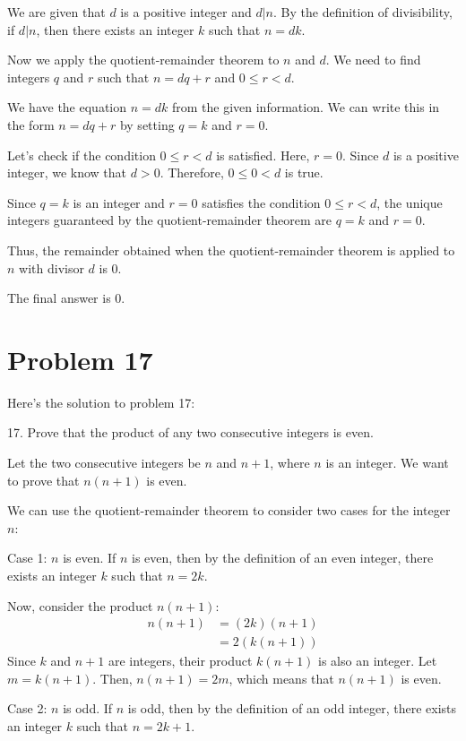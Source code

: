 \documentclass{article}
\begin{document}
We are given that $d$ is a positive integer and $d|n$.
By the definition of divisibility, if $d|n$, then there exists an integer $k$ such that $n = dk$.

Now we apply the quotient-remainder theorem to $n$ and $d$. We need to find integers $q$ and $r$ such that $n = dq + r$ and $0 \le r < d$.

We have the equation $n = dk$ from the given information.
We can write this in the form $n = dq + r$ by setting $q = k$ and $r = 0$.

Let's check if the condition $0 \le r < d$ is satisfied.
Here, $r = 0$.
Since $d$ is a positive integer, we know that $d > 0$.
Therefore, $0 \le 0 < d$ is true.

Since $q=k$ is an integer and $r=0$ satisfies the condition $0 \le r < d$, the unique integers guaranteed by the quotient-remainder theorem are $q=k$ and $r=0$.

Thus, the remainder obtained when the quotient-remainder theorem is applied to $n$ with divisor $d$ is 0.

The final answer is $\boxed{0}$.

\newpage

\section*{Problem 17}
Here's the solution to problem 17:

17. Prove that the product of any two consecutive integers is even.

Let the two consecutive integers be $n$ and $n+1$, where $n$ is an integer. We want to prove that $n(n+1)$ is even.

We can use the quotient-remainder theorem to consider two cases for the integer $n$:

Case 1: $n$ is even.
If $n$ is even, then by the definition of an even integer, there exists an integer $k$ such that $n = 2k$.

Now, consider the product $n(n+1)$:
$$
\begin{align*}
n(n+1) &= (2k)(n+1) \\
&= 2(k(n+1))
\end{align*}
$$
Since $k$ and $n+1$ are integers, their product $k(n+1)$ is also an integer. Let $m = k(n+1)$.
Then, $n(n+1) = 2m$, which means that $n(n+1)$ is even.

Case 2: $n$ is odd.
If $n$ is odd, then by the definition of an odd integer, there exists an integer $k$ such that $n = 2k+1$.
\end{document}
